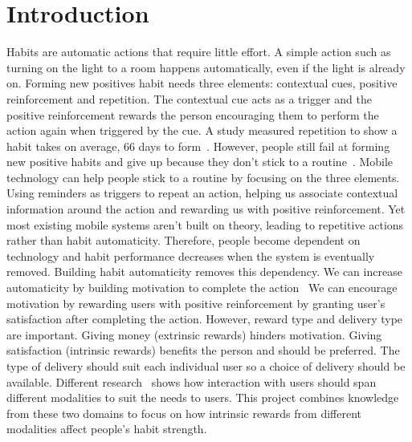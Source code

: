 
\section{Introduction}

Habits are automatic actions that require little effort. A simple action such as turning on the light to a room happens automatically, even if the light is already on.
Forming new positives habit needs three elements: contextual cues, positive
reinforcement and repetition.
The contextual cue acts as a trigger and the positive reinforcement rewards the
person encouraging them to perform the action again when triggered by the cue.
A study measured repetition to show a habit takes on average,
66 days to form~\cite{article_how_habits_formed_modelling_habit_formation}.
However, people still fail at forming new positive habits and give up because
they don't stick to a
routine~\cite{article_promoting_habit_formation, article_the_habitual_consumer}.\newline
\newline
Mobile technology can help people stick to a routine by focusing on the three elements.
Using reminders as triggers to repeat an action, helping us associate contextual
information around the action and rewarding us with positive reinforcement.
Yet most existing mobile systems aren't built on theory, leading to repetitive actions rather than habit automaticity.
Therefore, people become dependent on technology and habit performance decreases when the system is eventually removed.\newline
\newline
Building habit automaticity removes this dependency.
We can increase automaticity by building motivation to complete the action~\cite{article_a_self_efficacy, article_meta_analytic_review_intrinsic_motivation}
We can encourage motivation by rewarding users with positive reinforcement by granting user's satisfaction after completing the action.
However, reward type and delivery type are important. Giving money (extrinsic rewards) hinders motivation.
Giving satisfaction (intrinsic rewards) benefits the person and should be preferred.
The type of delivery should suit each individual user so a choice of delivery should be available.
Different research~\cite{article_user_centred_multimodal_reminders} shows how interaction with users should span different modalities to suit the needs to users.
This project combines knowledge from these two domains to focus on how intrinsic rewards from different modalities affect people's habit strength.\newline
